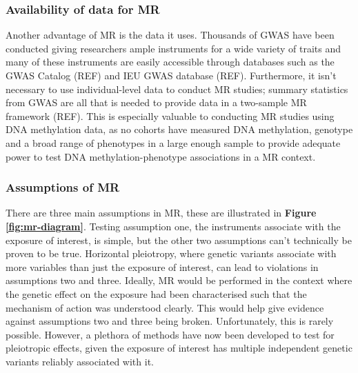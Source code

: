 \documentclass[11pt,twoside]{bristolthesis}
\begin{document}
\hypertarget{availability-of-data-for-mr}{%
\subsubsection{Availability of data for MR}\label{availability-of-data-for-mr}}

Another advantage of MR is the data it uses. Thousands of GWAS have been conducted giving researchers ample instruments for a wide variety of traits and many of these instruments are easily accessible through databases such as the GWAS Catalog (REF) and IEU GWAS database (REF). Furthermore, it isn't necessary to use individual-level data to conduct MR studies; summary statistics from GWAS are all that is needed to provide data in a two-sample MR framework (REF). This is especially valuable to conducting MR studies using DNA methylation data, as no cohorts have measured DNA methylation, genotype and a broad range of phenotypes in a large enough sample to provide adequate power to test DNA methylation-phenotype associations in a MR context.

\hypertarget{assumptions-of-mr}{%
\subsubsection{Assumptions of MR}\label{assumptions-of-mr}}

There are three main assumptions in MR, these are illustrated in \textbf{Figure \ref{fig:mr-diagram}}. Testing assumption one, the instruments associate with the exposure of interest, is simple, but the other two assumptions can't technically be proven to be true. Horizontal pleiotropy, where genetic variants associate with more variables than just the exposure of interest, can lead to violations in assumptions two and three. Ideally, MR would be performed in the context where the genetic effect on the exposure had been characterised such that the mechanism of action was understood clearly. This would help give evidence against assumptions two and three being broken. Unfortunately, this is rarely possible. However, a plethora of methods have now been developed to test for pleiotropic effects, given the exposure of interest has multiple independent genetic variants reliably associated with it.
\end{document}
